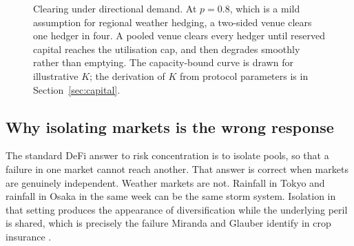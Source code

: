\documentclass[11pt,a4paper]{article}
\begin{document}
\begin{figure}[h]
\centering
{}
\caption{Clearing under directional demand. At $p = 0.8$, which is a mild assumption for
regional weather hedging, a two-sided venue clears one hedger in four. A pooled venue clears
every hedger until reserved capital reaches the utilisation cap, and then degrades smoothly
rather than emptying. The capacity-bound curve is drawn for illustrative $K$; the derivation
of $K$ from protocol parameters is in Section~\ref{sec:capital}.}
\label{fig:clearing}
\end{figure}

\subsection{Why isolating markets is the wrong response}

The standard DeFi answer to risk concentration is to isolate pools, so that a failure in one
market cannot reach another. That answer is correct when markets are genuinely independent.
Weather markets are not. Rainfall in Tokyo and rainfall in Osaka in the same week can be the
same storm system. Isolation in that setting produces the appearance of diversification while
the underlying peril is shared, which is precisely the failure Miranda and Glauber identify
in crop insurance \cite{miranda1997}.
\end{document}
